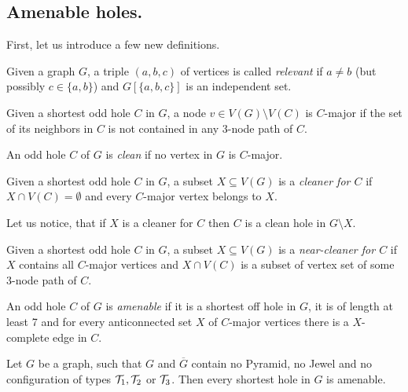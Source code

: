 \subsection{Amenable holes.}
\label{AmenableHoles}

First, let us introduce a few new definitions.

\begin{defn}
	Given a graph $G$, a triple $(a, b, c)$ of vertices is called \emph{relevant} if $a \neq b$ (but possibly $c \in \{a, b\}$) and $G[\{a,b,c\}]$ is an independent set.
\end{defn}

\begin{defn}
  Given a shortest odd hole $C$ in $G$, a node $v \in V(G) \setminus V(C)$ is $C$-major if the set of its neighbors in $C$ is not contained in any 3-node path of $C$.
\end{defn}

\begin{defn}
  An odd hole $C$ of $G$ is \emph{clean} if no vertex in $G$ is $C$-major.
\end{defn}

\begin{defn}[cleaner]
  Given a shortest odd hole $C$ in $G$, a subset $X \subseteq V(G)$ is a \emph{cleaner for $C$} if $X \cap V(C) = \emptyset$ and every $C$-major vertex belongs to $X$.
\end{defn}

Let us notice, that if $X$ is a cleaner for $C$ then $C$ is a clean hole in $G \setminus X$.

\begin{defn}
  Given a shortest odd hole $C$ in $G$, a subset $X \subseteq V(G)$ is a \emph{near-cleaner for $C$} if $X$ contains all $C$-major vertices and $X \cap V(C)$ is a subset of vertex set of some 3-node path of $C$.
\end{defn}

\begin{defn}
  An odd hole $C$ of $G$ is \emph{amenable} if it is a shortest off hole in $G$, it is of length at least 7 and for every anticonnected set $X$ of $C$-major vertices there is a $X$-complete edge in $C$.
\end{defn}

\begin{theorem}
	\label{thm:amenableHoles}
	Let $G$ be a graph, such that $G$ and $\overline{G}$ contain no Pyramid, no Jewel and no configuration of types $\mathcal{T}_1, \mathcal{T}_2$ or $\mathcal{T}_3$. Then every shortest hole in $G$ is amenable.
\end{theorem}

